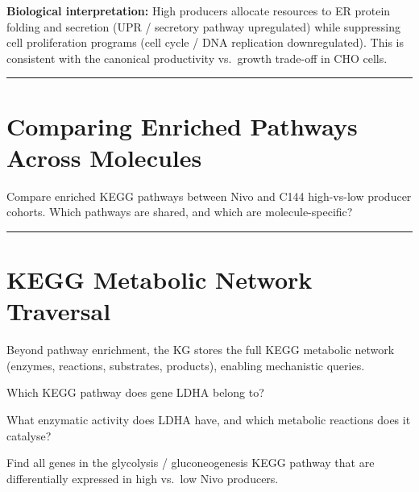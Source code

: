 \documentclass[
  letterpaper,
  oneside,
  open=any]{scrbook}
\begin{document}
\begin{tcolorbox}[enhanced jigsaw, arc=.35mm, bottomrule=.15mm, bottomtitle=1mm, breakable, colback=white, colbacktitle=quarto-callout-tip-color!10!white, colframe=quarto-callout-tip-color-frame, coltitle=black, left=2mm, leftrule=.75mm, opacityback=0, opacitybacktitle=0.6, rightrule=.15mm, title=\textcolor{quarto-callout-tip-color}{\faLightbulb}\hspace{0.5em}{Tip}, titlerule=0mm, toprule=.15mm, toptitle=1mm]

\textbf{Biological interpretation:} High producers allocate resources to
ER protein folding and secretion (UPR / secretory pathway upregulated)
while suppressing cell proliferation programs (cell cycle / DNA
replication downregulated). This is consistent with the canonical
productivity vs.~growth trade-off in CHO cells.

\end{tcolorbox}

\begin{center}\rule{0.5\linewidth}{0.5pt}\end{center}

\section{Comparing Enriched Pathways Across
Molecules}\label{comparing-enriched-pathways-across-molecules}

Compare enriched KEGG pathways between Nivo and C144 high-vs-low
producer cohorts. Which pathways are shared, and which are
molecule-specific?

\begin{center}\rule{0.5\linewidth}{0.5pt}\end{center}

\section{KEGG Metabolic Network
Traversal}\label{kegg-metabolic-network-traversal}

Beyond pathway enrichment, the KG stores the full KEGG metabolic network
(enzymes, reactions, substrates, products), enabling mechanistic
queries.

Which KEGG pathway does gene LDHA belong to?

What enzymatic activity does LDHA have, and which metabolic reactions
does it catalyse?

Find all genes in the glycolysis / gluconeogenesis KEGG pathway that are
differentially expressed in high vs.~low Nivo producers.
\end{document}
